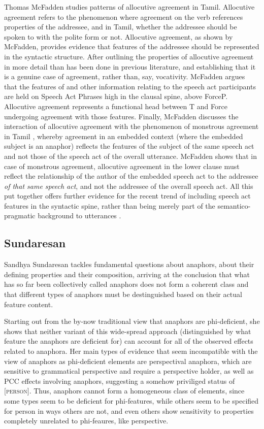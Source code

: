 \documentclass[output=paper
,modfonts
,nonflat]{langsci/langscibook}
\begin{document}
Thomas McFadden studies patterns of allocutive agreement in Tamil.
Allocutive agreement refers to the phenomenon where agreement on the verb references properties of the addressee, and in Tamil, whether the addressee should be spoken to with the polite form or not.
Allocutive agreement, as shown by McFadden, provides evidence that features of the addressee should be represented in the syntactic structure.
After outlining the properties of allocutive agreement in more detail than has been done in previous literature, and establishing that it is a genuine case of agreement, rather than, say, vocativity. McFadden argues that the features of and other information relating to the speech act participants are held on Speech Act Phrases high in the clausal spine, above ForceP.
Allocutive agreement represents a functional head between T and Force undergoing agreement with those features.
Finally, McFadden discusses the interaction of allocutive agreement with the phenomenon of monstrous agreement in Tamil \citep{sundaresan2012}, whereby agreement in an embedded context (where the embedded subject is an anaphor) reflects the features of the subject of the same speech act and not those of the speech act of the overall utterance.
McFadden shows that in case of monstrous agreement, allocutive agreement in the lower clause must reflect the relationship of the author of the embedded speech act to the addressee \emph{of that same speech act}, and not the addressee of the overall speech act.
All this put together offers further evidence for the recent trend of including speech act features in the syntactic spine, rather than being merely part of the semantico-pragmatic background to utterances \citep{HaegemanHill2013,zu2015,Miyagawa2017}.

\subsection{Sundaresan}
\label{sec:sundaresan}

Sandhya Sundaresan tackles fundamental questions about anaphors, about their defining properties and their composition, arriving at the conclusion that what has so far been collectively called anaphors does not form a coherent class and that different types of anaphors must be destinguished based on their actual feature content.

Starting out from the by-now traditional view that anaphors are phi-deficient, she shows that neither variant of this wide-spread approach (distinguished by what feature the anaphors are deficient for) can account for all of the observed effects related to anaphora. Her main types of evidence that seem incompatible with the view of anaphors as phi-deficient elements are perspectival anaphora, which are sensitive to grammatical perspective and require a perspective holder, as well as PCC effects involving anaphors, suggesting a somehow priviliged status of [\textsc{person}]. Thus, anaphors cannot form a homogeneous class of elements, since some types seem to be deficient for phi-features, while others seem to be specified for person in ways others are not, and even others show sensitivity to properties completely unrelated to phi-feaures, like perspective.
\end{document}
